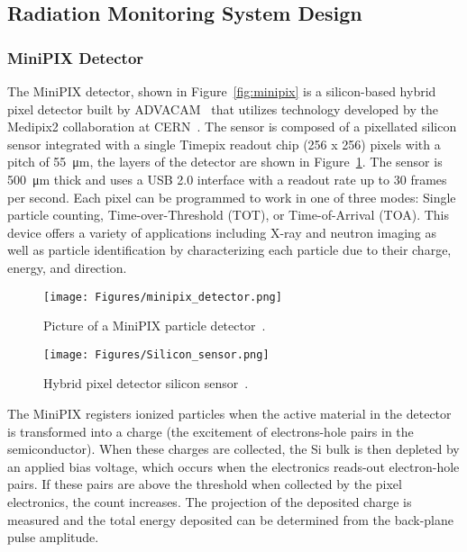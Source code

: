 \subsection{Radiation Monitoring System Design}
\label{sec:Radiation Design}
\subsubsection{MiniPIX Detector}
The MiniPIX detector, shown in Figure~\ref{fig:minipix} is a silicon-based hybrid pixel detector built by ADVACAM~\cite{advacam} that utilizes technology developed by the Medipix2 collaboration at CERN~\cite{medipix}. The sensor is composed of a pixellated silicon sensor integrated with a single Timepix readout chip (256 x 256) pixels with a pitch of \SI{55}{\micro\meter}, the layers of the detector are shown in Figure~\ref{fig:minipixlayers}. The sensor is \SI{500}{\micro\meter} thick and uses a USB 2.0 interface with a readout rate up to 30 frames per second. Each pixel can be programmed to work in one of three modes: Single particle counting, Time-over-Threshold (TOT), or Time-of-Arrival (TOA). This device offers a variety of applications including X-ray and neutron imaging as well as particle identification by characterizing each particle due to their charge, energy, and direction.

\begin{figure}[H]
  \begin{minipage}[c]{0.40\linewidth}
    \texttt{[image: Figures/minipix\_detector.png]}
    \caption{Picture of a MiniPIX particle detector~\cite{advacam}.} %
    \label{fig:minipix}
  \end{minipage}
  \hfill
  \begin{minipage}[c]{0.45\linewidth}
    \texttt{[image: Figures/Silicon\_sensor.png]}
    \caption{Hybrid pixel detector silicon sensor~\cite{silicon_sensor}.} %
    \label{fig:minipixlayers}
  \end{minipage}
\end{figure}

The MiniPIX registers ionized particles when the active material in the detector is transformed into a charge (the excitement of electrons-hole pairs in the semiconductor). When these charges are collected, the Si bulk is then depleted by an applied bias voltage, which occurs when the electronics reads-out electron-hole pairs. If these pairs are above the threshold when collected by the pixel electronics, the count increases. The projection of the deposited charge is measured and the total energy deposited can be determined from the back-plane pulse amplitude. 

